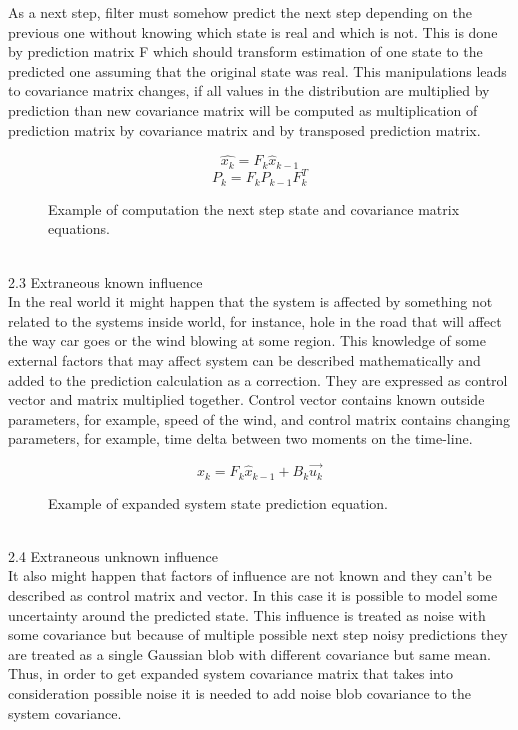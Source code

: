 \documentclass[../../main]{subfiles}
\begin{document}
As a next step, filter must somehow predict the next step depending on the previous one without knowing which state is real and which is not. This is done by prediction matrix F which should transform estimation of one state to the predicted one assuming that the original state was real. This manipulations leads to covariance matrix changes, if all values in the distribution are multiplied by prediction than new covariance matrix will be computed as multiplication of prediction matrix by covariance matrix and by transposed prediction matrix.

\begin{figure} [!ht]
  \centering    
    \begin{equation}
       \hat{x_k} = F_k \hat{x}_{k-1}
    \end{equation}
     \begin{equation}
       P_k = F_k P_{k-1} F_k^T
    \end{equation}
  \caption{Example of computation the next step state and covariance matrix equations.}
\end{figure}
\\
2.3 Extraneous known influence \\

In the real world it might happen that the system is affected by something not related to the systems inside world, for instance, hole in the road that will affect the way car goes or the wind blowing at some region. This knowledge of some external factors that may affect system can be described mathematically and added to the prediction calculation as a correction. They are expressed as control vector and matrix multiplied together. Control vector contains known outside parameters, for example, speed of the wind, and control matrix contains changing parameters, for example, time delta between two moments on the time-line.

\begin{figure} [!ht]
  \centering    
    \begin{equation}
       \hat{x_k} = F_k \hat{x}_{k-1} + B_k\vec{u_k}
    \end{equation}
  \caption{Example of expanded system state prediction equation.}
\end{figure}

\\
2.4 Extraneous unknown influence \\

It also might happen that factors of influence are not known and they can’t be described as control matrix and vector. In this case it is possible to model some uncertainty around the predicted state. This influence is treated as noise with some covariance but because of multiple possible next step noisy predictions they are treated as a single Gaussian blob with different covariance but same mean.
Thus, in order to get expanded system covariance matrix that takes into consideration possible noise it is needed to add noise blob covariance to the system covariance.
\end{document}
